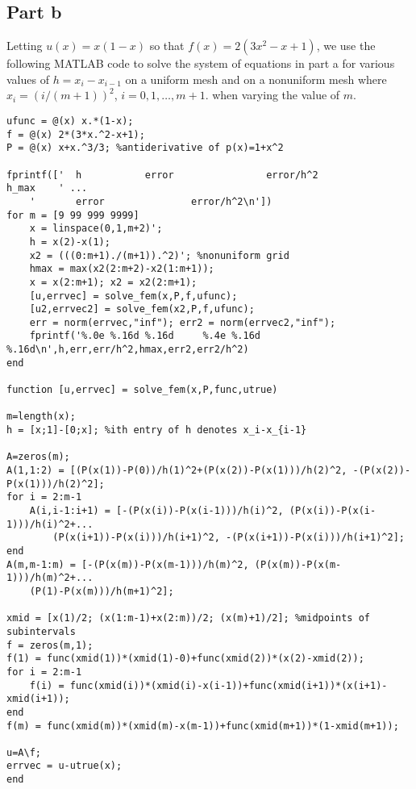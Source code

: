 \documentclass{article}
\begin{document}
\subsection{Part b}
Letting $u(x)=x(1-x)$ so that $f(x) = 2(3 x^2 -x + 1)$, we use the following MATLAB code to solve the system of equations in part a for various values of $h=x_i-x_{i-1}$ on a uniform mesh and on a nonuniform mesh where $x_i = (i/(m+1) )^2$, $i=0,1, \ldots,m+1$. when varying the value of $m$.
\begin{verbatim}
ufunc = @(x) x.*(1-x);
f = @(x) 2*(3*x.^2-x+1);
P = @(x) x+x.^3/3; %antiderivative of p(x)=1+x^2

fprintf(['  h           error                error/h^2               h_max    ' ...
    '       error               error/h^2\n'])
for m = [9 99 999 9999]
    x = linspace(0,1,m+2)';
    h = x(2)-x(1);
    x2 = (((0:m+1)./(m+1)).^2)'; %nonuniform grid
    hmax = max(x2(2:m+2)-x2(1:m+1));
    x = x(2:m+1); x2 = x2(2:m+1);
    [u,errvec] = solve_fem(x,P,f,ufunc);
    [u2,errvec2] = solve_fem(x2,P,f,ufunc);
    err = norm(errvec,"inf"); err2 = norm(errvec2,"inf");
    fprintf('%.0e %.16d %.16d     %.4e %.16d %.16d\n',h,err,err/h^2,hmax,err2,err2/h^2)
end

function [u,errvec] = solve_fem(x,P,func,utrue)

m=length(x);
h = [x;1]-[0;x]; %ith entry of h denotes x_i-x_{i-1}

A=zeros(m);
A(1,1:2) = [(P(x(1))-P(0))/h(1)^2+(P(x(2))-P(x(1)))/h(2)^2, -(P(x(2))-P(x(1)))/h(2)^2];
for i = 2:m-1
    A(i,i-1:i+1) = [-(P(x(i))-P(x(i-1)))/h(i)^2, (P(x(i))-P(x(i-1)))/h(i)^2+...
        (P(x(i+1))-P(x(i)))/h(i+1)^2, -(P(x(i+1))-P(x(i)))/h(i+1)^2];
end
A(m,m-1:m) = [-(P(x(m))-P(x(m-1)))/h(m)^2, (P(x(m))-P(x(m-1)))/h(m)^2+...
    (P(1)-P(x(m)))/h(m+1)^2];

xmid = [x(1)/2; (x(1:m-1)+x(2:m))/2; (x(m)+1)/2]; %midpoints of subintervals
f = zeros(m,1);
f(1) = func(xmid(1))*(xmid(1)-0)+func(xmid(2))*(x(2)-xmid(2));
for i = 2:m-1
    f(i) = func(xmid(i))*(xmid(i)-x(i-1))+func(xmid(i+1))*(x(i+1)-xmid(i+1));
end
f(m) = func(xmid(m))*(xmid(m)-x(m-1))+func(xmid(m+1))*(1-xmid(m+1));

u=A\f;
errvec = u-utrue(x);
end
\end{verbatim}
\end{document}
